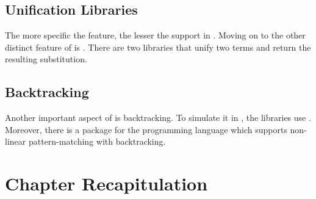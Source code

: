 \documentclass[thesis-solanki.tex]{subfiles}
\begin{document}
\subsection{Unification Libraries}

The more specific the feature, the lesser the support in .
Moving on to the other distinct feature of  is .
There are two libraries 
 that unify two  terms and return the resulting
substitution.


\subsection{Backtracking}

Another important aspect of  is backtracking.
To simulate it in , the libraries \cite{stream-monad-lib, logicst-lib} use .
Moreover, there is a package for the  programming language \cite{egison-lib} which supports
non-linear pattern-matching with backtracking.




\section{Chapter Recapitulation}


\ifMain
\begin{scope}
  \nolinenumbers
  \enotesize
  \par
  \begin{singlespace}
  \setlength{\parskip}{12pt plus 2pt minus 1pt}
  \theendnotes
  \par
  \end{singlespace}
\end{scope}
\fi
\end{document}

